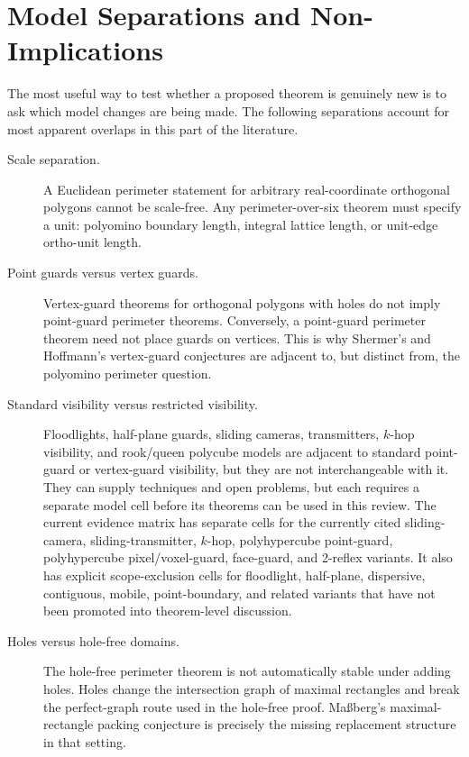 \documentclass[11pt]{article}
\begin{document}
\clearpage

\section{Model Separations and Non-Implications}

The most useful way to test whether a proposed theorem is genuinely new is to
ask which model changes are being made.  The following separations account for
most apparent overlaps in this part of the literature.

\begin{description}
  \item[Scale separation.]
  A Euclidean perimeter statement for arbitrary real-coordinate orthogonal
  polygons cannot be scale-free.  Any perimeter-over-six theorem must specify a
  unit: polyomino boundary length, integral lattice length, or unit-edge
  ortho-unit length.

  \item[Point guards versus vertex guards.]
  Vertex-guard theorems for orthogonal polygons with holes do not imply
  point-guard perimeter theorems.  Conversely, a point-guard perimeter theorem
  need not place guards on vertices.  This is why Shermer's and Hoffmann's
  vertex-guard conjectures are adjacent to, but distinct from, the polyomino
  perimeter question.

  \item[Standard visibility versus restricted visibility.]
  Floodlights, half-plane guards, sliding cameras, transmitters, $k$-hop
  visibility, and rook/queen polycube models are adjacent to standard
  point-guard or vertex-guard visibility, but they are not interchangeable
  with it.  They can supply techniques and open problems, but each requires a
  separate model cell before its theorems can be used in this review.  The
  current evidence matrix has separate cells for the currently cited
  sliding-camera, sliding-transmitter, $k$-hop, polyhypercube point-guard,
  polyhypercube pixel/voxel-guard, face-guard, and 2-reflex variants.  It
  also has explicit scope-exclusion cells for
  floodlight, half-plane, dispersive, contiguous, mobile, point-boundary, and
  related variants that have not been promoted into theorem-level discussion.

  \item[Holes versus hole-free domains.]
  The hole-free perimeter theorem is not automatically stable under adding
  holes.  Holes change the intersection graph of maximal rectangles and break
  the perfect-graph route used in the hole-free proof.  Ma{\ss}berg's
  maximal-rectangle packing conjecture is precisely the missing replacement
  structure in that setting.


\end{description}
\end{document}
